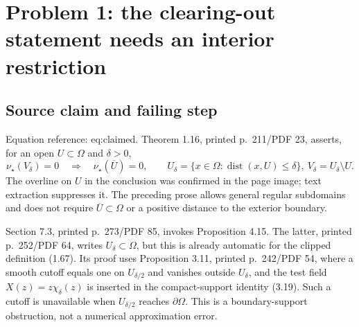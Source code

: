 \documentclass[10pt]{article}
\begin{document}
\section*{Problem 1: the clearing-out statement needs an interior restriction}
\subsection*{Source claim and failing step}
Equation reference: eq:claimed. Theorem 1.16, printed p. 211/PDF 23, asserts, for an open \(U\subset\Omega\) and \(\delta>0\), \[
 \nu_\star(V_\delta)=0\quad\Longrightarrow\quad
 \nu_\star(\overline U)=0 ,
 \qquad
 U_\delta=\{x\in\Omega:\operatorname{dist}(x,U)\le\delta\},\
 V_\delta=U_\delta\setminus U .\] The overline on \(U\) in the conclusion was confirmed in the page image; text extraction suppresses it. The preceding prose allows general regular subdomains and does not require \(\overline U\subset\Omega\) or a positive distance to the exterior boundary.\par
Section 7.3, printed p. 273/PDF 85, invokes Proposition 4.15. The latter, printed p. 252/PDF 64, writes \(U_\delta\subset\Omega\), but this is already automatic for the clipped definition (1.67). Its proof uses Proposition 3.11, printed p. 242/PDF 54, where a smooth cutoff equals one on \(U_{\delta/2}\) and vanishes outside \(U_\delta\), and the test field \(X(z)=z\chi_\delta(z)\) is inserted in the compact-support identity (3.19). Such a cutoff is unavailable when \(U_{\delta/2}\) reaches \(\partial\Omega\). This is a boundary-support obstruction, not a numerical approximation error.\par
\end{document}
